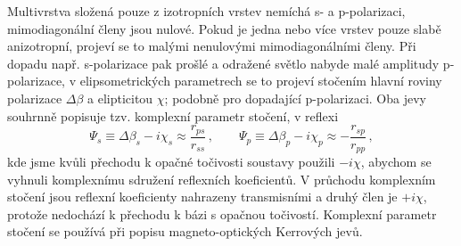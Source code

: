 Multivrstva složená pouze z izotropních vrstev nemíchá s- a p-polarizaci, mimodiagonální členy jsou nulové.
Pokud je jedna nebo více vrstev pouze slabě anizotropní, projeví se to malými nenulovými mimodiagonálními členy.
Při dopadu např. s-polarizace pak prošlé a odražené světlo nabyde malé amplitudy p-polarizace, v elipsometrických parametrech se to projeví stočením hlavní roviny polarizace $\Delta \beta$ a elipticitou $\chi$; podobně pro dopadající p-polarizaci. 
Oba jevy souhrnně popisuje tzv. komplexní parametr stočení\cite{silberQuadraticMagnetoopticKerr2019a}, v reflexi
\begin{equation}
\label{eqn:komplexni-rotace}
    \Psi_s \equiv \Delta \beta_s - i \chi_s \approx \frac{r_{ps}}{r_{ss}} 
    \,, \qquad \Psi_p \equiv \Delta \beta_p - i \chi_p \approx -\frac{r_{sp}}{r_{pp}} \,,
\end{equation}
kde jsme kvůli přechodu k opačné točivosti soustavy použili $-i\chi$, abychom se vyhnuli komplexnímu sdružení reflexních koeficientů.
V průchodu komplexním stočení jsou reflexní koeficienty nahrazeny transmisními a druhý člen je $+i\chi$, protože nedochází k přechodu k bázi s opačnou točivostí.
Komplexní parametr stočení se používá při popisu magneto-optických Kerrových jevů.
